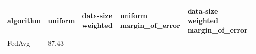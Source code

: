 \begin{tabular}{lllll}
\toprule
algorithm & uniform & data-size weighted & uniform margin_of_error & data-size weighted margin_of_error \\
\midrule
FedAvg & 87.43%
\bottomrule
\end{tabular}
